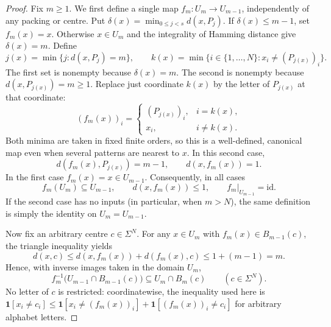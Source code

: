\begin{proof}
Fix $m\geq1$. We first define a single map
$f_m:U_m\longrightarrow U_{m-1}$, independently of any packing or centre.
Put $\delta(x)=\min_{0\leq j<s}d(x,P_j)$. If $\delta(x)\leq m-1$, set
$f_m(x)=x$. Otherwise $x\in U_m$ and the integrality of Hamming distance
give $\delta(x)=m$. Define
\[
 j(x)=\min\{j:d(x,P_j)=m\},\qquad
 k(x)=\min\{i\in\{1,\ldots,N\}:x_i\ne(P_{j(x)})_i\}.
\]
The first set is nonempty because $\delta(x)=m$. The second is nonempty
because $d(x,P_{j(x)})=m\geq1$. Replace just coordinate $k(x)$ by the
letter of $P_{j(x)}$ at that coordinate:
\[
 (f_m(x))_i=
 \begin{cases}
 (P_{j(x)})_i,&i=k(x),\\
 x_i,&i\ne k(x).
 \end{cases}
\]
Both minima are taken in fixed finite orders, so this is a well-defined,
canonical map even when several patterns are nearest to $x$. In this
second case,
\[
 d(f_m(x),P_{j(x)})=m-1,\qquad d(x,f_m(x))=1.
\]
In the first case $f_m(x)=x\in U_{m-1}$. Consequently, in all cases
\[
 f_m(U_m)\subseteq U_{m-1},\qquad
 d(x,f_m(x))\leq1,
 \qquad f_m|_{U_{m-1}}=\mathrm{id}.
\]
If the second case has no inputs (in particular, when $m>N$), the same
definition is simply the identity on $U_m=U_{m-1}$.

Now fix an arbitrary centre $c\in\Sigma^N$. For any $x\in U_m$ with
$f_m(x)\in B_{m-1}(c)$, the triangle inequality yields
\[
 d(x,c)\leq d(x,f_m(x))+d(f_m(x),c)\leq1+(m-1)=m.
\]
Hence, with inverse images taken in the domain $U_m$,
\begin{equation}
 \label{eq:mismatch-preimage}
 f_m^{-1}\bigl(U_{m-1}\cap B_{m-1}(c)\bigr)
 \subseteq U_m\cap B_m(c)
 \qquad(c\in\Sigma^N).
\end{equation}
No letter of $c$ is restricted: coordinatewise, the inequality used here
is $\mathbf1[x_i\ne c_i]\leq\mathbf1[x_i\ne(f_m(x))_i]
+\mathbf1[(f_m(x))_i\ne c_i]$ for arbitrary alphabet letters.


\end{proof}
